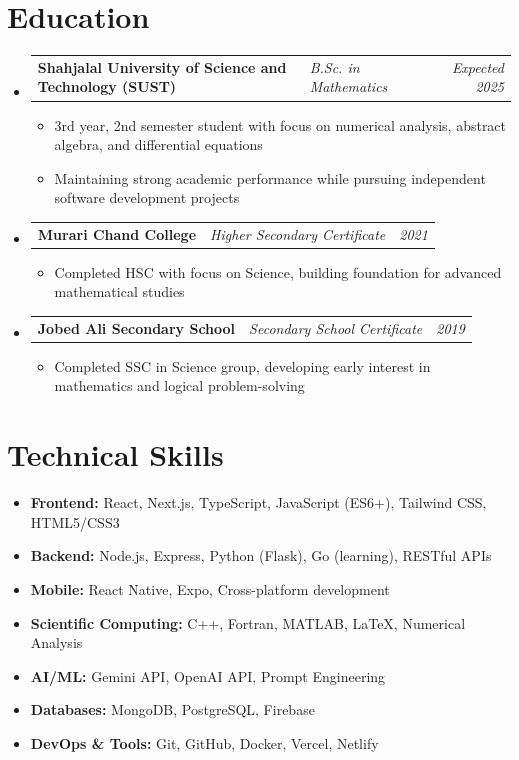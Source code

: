 \documentclass[a4paper, 10pt]{article}
\makeatletter
\newcommand{\resumeheading}[3]{
    \item
    \begin{tabularx}{\linewidth}{@{}l X r@{}}
        \textbf{\large #1} & \textit{#2} & \textit{\small #3} \\
    \end{tabularx}
    \vspace{-8pt}
}
\newcommand{\skillcategory}[2]{
    \item \textbf{#1:} #2
}
\makeatother
\begin{document}
\section{Education}
\begin{itemize}[leftmargin=0.15in]
    \resumeheading{Shahjalal University of Science and Technology (SUST)}{B.Sc. in Mathematics}{Expected 2025}
    \begin{itemize}
        \item 3rd year, 2nd semester student with focus on numerical analysis, abstract algebra, and differential equations
        \item Maintaining strong academic performance while pursuing independent software development projects
    \end{itemize}
    
    \vspace{4pt}
    \resumeheading{Murari Chand College}{Higher Secondary Certificate}{2021}
    \begin{itemize}
        \item Completed HSC with focus on Science, building foundation for advanced mathematical studies
    \end{itemize}
    
    \vspace{4pt}
    \resumeheading{Jobed Ali Secondary School}{Secondary School Certificate}{2019}
    \begin{itemize}
        \item Completed SSC in Science group, developing early interest in mathematics and logical problem-solving
    \end{itemize}
\end{itemize}

\section{Technical Skills}
\begin{itemize}
    \skillcategory{Frontend}{React, Next.js, TypeScript, JavaScript (ES6+), Tailwind CSS, HTML5/CSS3}
    \skillcategory{Backend}{Node.js, Express, Python (Flask), Go (learning), RESTful APIs}
    \skillcategory{Mobile}{React Native, Expo, Cross-platform development}
    \skillcategory{Scientific Computing}{C++, Fortran, MATLAB, LaTeX, Numerical Analysis}
    \skillcategory{AI/ML}{Gemini API, OpenAI API, Prompt Engineering}
    \skillcategory{Databases}{MongoDB, PostgreSQL, Firebase}
    \skillcategory{DevOps \& Tools}{Git, GitHub, Docker, Vercel, Netlify}
\end{itemize}
\end{document}
